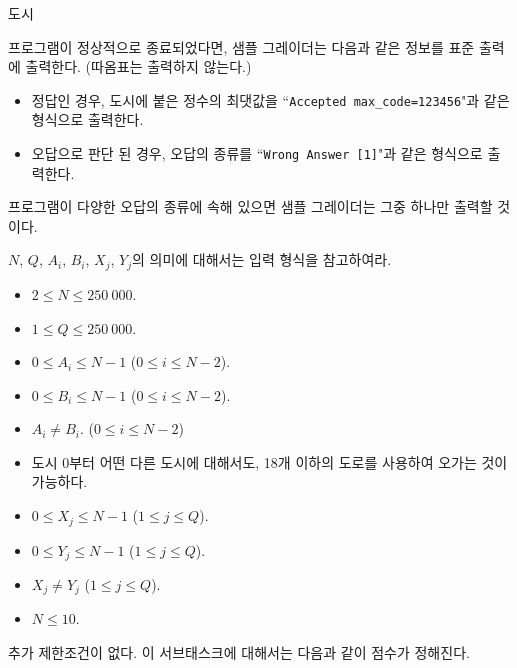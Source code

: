 \begin{problem}{도시}
	
	\OutputFile
	
	프로그램이 정상적으로 종료되었다면, 샘플 그레이더는 다음과 같은 정보를 표준 출력에 출력한다. (따옴표는 출력하지 않는다.)
	
	\begin{itemize}
		\item 정답인 경우, 도시에 붙은 정수의 최댓값을 ``\texttt{Accepted max\_code=123456}"과 같은 형식으로 출력한다. 
		\item 오답으로 판단 된 경우, 오답의 종류를 ``\texttt{Wrong Answer [1]}"과 같은 형식으로 출력한다.
	\end{itemize}
	
	프로그램이 다양한 오답의 종류에 속해 있으면 샘플 그레이더는 그중 하나만 출력할 것이다.
	
	\Constraints
	
	$N$, $Q$, $A_i$, $B_i$, $X_j$, $Y_j$의 의미에 대해서는 입력 형식을 참고하여라.
	
	\begin{itemize}
		\item $2 \le N \le 250\ 000$.
		\item $1 \le Q \le 250\ 000$.
		\item $0 \le A_i \le N-1$ ($0 \le i \le N-2$).
		\item $0 \le B_i \le N-1$ ($0 \le i \le N-2$).
		\item $A_i \ne B_i$. ($0 \le i \le N-2$)
		\item 도시 0부터 어떤 다른 도시에 대해서도, 18개 이하의 도로를 사용하여 오가는 것이 가능하다.
		\item $0 \le X_j \le N-1$ ($1 \le j \le Q$).
		\item $0 \le Y_j \le N-1$ ($1 \le j \le Q$).
		\item $X_j \ne Y_j$ ($1 \le j \le Q$).
	\end{itemize}
	
	
	\begin{itemize}
		\item $N \le 10$.
	\end{itemize}
	
	
	
	추가 제한조건이 없다. 이 서브태스크에 대해서는 다음과 같이 점수가 정해진다.
	

\end{problem}
